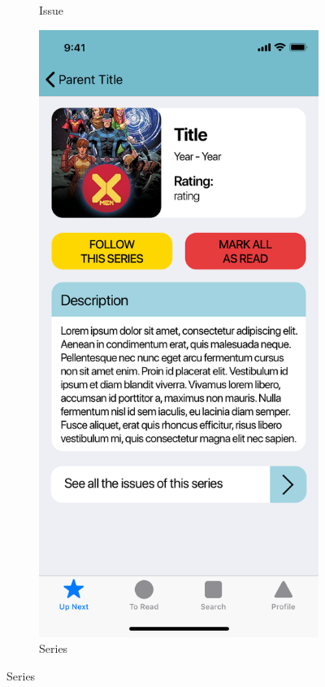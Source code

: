 \begin{figure}[p]
\begin{subfigure}[b]{0.4\textwidth}
    \caption{Issue}
    \label{fig:1}
  \end{subfigure}
  \hfill
  \begin{subfigure}[b]{0.4\textwidth}
    \includegraphics[width=\textwidth]{img/mockups/series}
    \caption{Series}
    \label{fig:2}
  \end{subfigure}
\end{figure}

